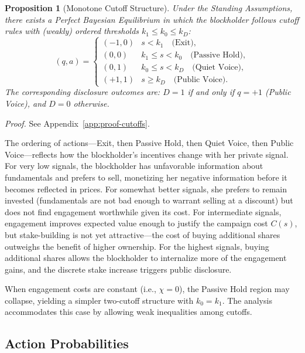 \documentclass[11pt]{article}
\newtheorem{proposition}{Proposition}
\newcommand{\1}{\mathbf{1}}
\begin{document}
\begin{proposition}[Monotone Cutoff Structure]
\label{prop:cutoffs}
Under the Standing Assumptions, there exists a Perfect Bayesian Equilibrium in which the blockholder follows cutoff rules with (weakly) ordered thresholds $k_1 \leq k_0 \leq k_D$:
\[
(q, a) = \begin{cases}
(-1, 0) & s < k_1 \quad \text{(Exit)}, \\
(0, 0) & k_1 \leq s < k_0 \quad \text{(Passive Hold)}, \\
(0, 1) & k_0 \leq s < k_D \quad \text{(Quiet Voice)}, \\
(+1, 1) & s \geq k_D \quad \text{(Public Voice)}.
\end{cases}
\]
The corresponding disclosure outcomes are: $D = 1$ if and only if $q = +1$ (Public Voice), and $D = 0$ otherwise.
\end{proposition}
\textit{Proof.} See Appendix~\ref{app:proof-cutoffs}.

The ordering of actions---Exit, then Passive Hold, then Quiet Voice, then Public Voice---reflects how the blockholder's incentives change with her private signal. For very low signals, the blockholder has unfavorable information about fundamentals and prefers to sell, monetizing her negative information before it becomes reflected in prices. For somewhat better signals, she prefers to remain invested (fundamentals are not bad enough to warrant selling at a discount) but does not find engagement worthwhile given its cost. For intermediate signals, engagement improves expected value enough to justify the campaign cost $C(s)$, but stake-building is not yet attractive---the cost of buying additional shares outweighs the benefit of higher ownership. For the highest signals, buying additional shares allows the blockholder to internalize more of the engagement gains, and the discrete stake increase triggers public disclosure.

When engagement costs are constant (i.e., $\chi=0$), the Passive Hold region may collapse, yielding a simpler two-cutoff structure with $k_0=k_1$. The analysis accommodates this case by allowing weak inequalities among cutoffs.

\subsection{Action Probabilities}
\end{document}
